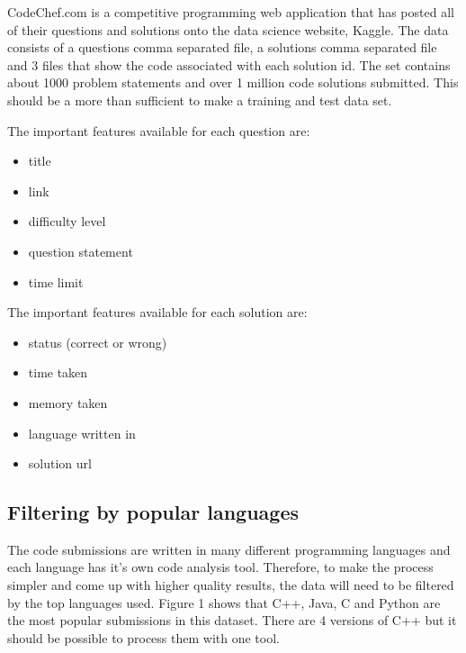 \documentclass{article}
\begin{document}
CodeChef.com is a competitive programming web application that has
posted all of their questions and solutions onto the data science
website, Kaggle. The data consists of a questions comma separated file,
a solutions comma separated file and 3 files that show the code
associated with each solution id. The set contains about 1000 problem
statements and over 1 million code solutions submitted. This should be a
more than sufficient to make a training and test data set.

The important features available for each question are:

\begin{itemize}
\item
  title
\item
  link
\item
  difficulty level
\item
  question statement
\item
  time limit
\end{itemize}

The important features available for each solution are:

\begin{itemize}
\item
  status (correct or wrong)
\item
  time taken
\item
  memory taken
\item
  language written in
\item
  solution url
\end{itemize}

\subsection{Filtering by popular
languages}\label{filtering-by-popular-languages}

The code submissions are written in many different programming languages
and each language has it's own code analysis tool. Therefore, to make
the process simpler and come up with higher quality results, the data
will need to be filtered by the top languages used. Figure 1 shows that
C++, Java, C and Python are the most popular submissions in this
dataset. There are 4 versions of C++ but it should be possible to
process them with one tool.
\end{document}

